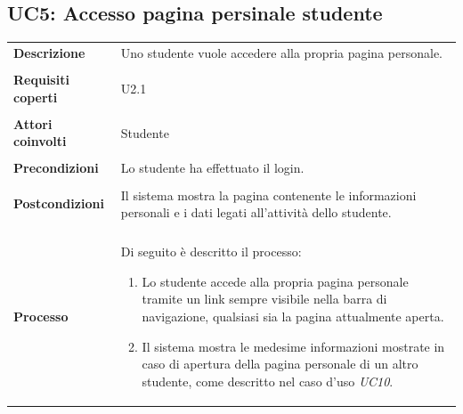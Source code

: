 \documentclass[10pt,a4paper]{report}
\begin{document}
	\subsection{UC5: Accesso pagina persinale studente}
	\begin{tabular}{lp{}}
		\textbf{Descrizione}&Uno studente vuole accedere alla propria pagina personale.\\
		\\
		\textbf{Requisiti coperti}&U2.1\\
		\\
		\textbf{Attori coinvolti}&Studente\\
		\\
		\textbf{Precondizioni}&Lo studente ha effettuato il login.\\
		\\
		\textbf{Postcondizioni}&Il sistema mostra la pagina contenente le informazioni personali e i dati legati all'attività dello studente.\\
		\\
		\textbf{Processo}&Di seguito è descritto il processo:
		\begin{enumerate}
			\item Lo studente accede alla propria pagina personale tramite un link sempre visibile nella barra di navigazione, qualsiasi sia la pagina attualmente aperta.
			\item Il sistema mostra le medesime informazioni mostrate in caso di apertura della pagina personale di un altro studente, come descritto nel caso d'uso \textit{UC10}.
		\end{enumerate}
	\end{tabular}
\end{document}
